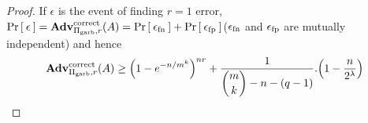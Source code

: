 \begin{proof}
If $\epsilon$ is the event of finding $r=1$ error, $\Pr\left[\: \epsilon \:\right] = \mathrm{\mathbf{Adv}}^{\mathrm{correct}}_{\Pi_{\mathrm{garb}},r}(A) =  \Pr\left[\: \epsilon_{\mathrm{fn}} \:\right] + \Pr\left[\: \epsilon_{\mathrm{fp}} \:\right]$($\epsilon_{\mathrm{fn}}$ and $\epsilon_{\mathrm{fp}}$ are mutually independent) and hence 
\[
\mathrm{\mathbf{Adv}}^{\mathrm{correct}}_{\Pi_{\mathrm{garb}},r}(A)  \geq \left(1 - e^{-n/m^k}\right)^{nr} + \dfrac{1}{\dbinom{m}{k}-n-(q-1)} . \Big(1-\dfrac{n}{2^\lambda}\Big)
\]

\end{proof}
